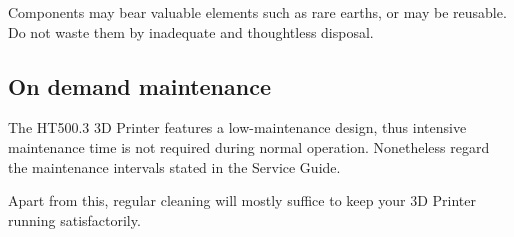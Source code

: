 \begin{info}
  Components may bear valuable elements such as rare earths, or may be reusable. Do not waste them by inadequate and thoughtless disposal.
\end{info}



\subsection{On demand maintenance}

The HT500.3 3D Printer features a low-maintenance design, thus intensive maintenance time is not required during normal operation. Nonetheless regard the maintenance intervals stated in the Service Guide.

Apart from this, regular cleaning will mostly suffice to keep your 3D Printer running satisfactorily.

